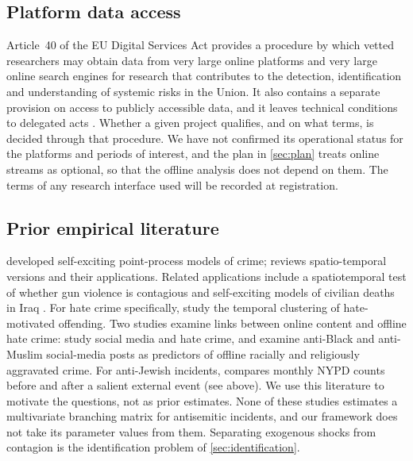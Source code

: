 \FloatBarrier
\subsection{Platform data access}\label{app:data-platform}

Article~40 of the EU Digital Services Act provides a procedure by which
vetted researchers may obtain data from very large online platforms and
very large online search engines for research that contributes to the detection,
identification and understanding of systemic risks in the Union. It also
contains a separate provision on access to publicly accessible data, and it
leaves technical conditions to delegated acts \citep{eu2022dsa}. Whether a
given project qualifies, and on what terms, is decided through that
procedure. We have not confirmed its operational status for the platforms
and periods of interest, and the plan in \cref{sec:plan} treats online
streams as optional, so that the offline analysis does not depend on them.
The terms of any research interface used will be recorded at registration.

\subsection{Prior empirical literature}\label{sec:data-lit}

 developed self-exciting point-process models of
crime; \citet{reinhart2018} reviews spatio-temporal versions and their
applications. Related applications include a spatiotemporal test of whether
gun violence is contagious \citep{loeffler2018} and self-exciting models of
civilian deaths in Iraq \citep{lewis2012}. For hate crime specifically,
\citet{king2013} study the temporal clustering of hate-motivated offending.
Two studies examine links between online content and offline hate crime:
\citet{muller2021} study social media and hate crime, and
\citet{williams2020} examine anti-Black and anti-Muslim social-media posts
as predictors of offline racially and religiously aggravated crime. For
anti-Jewish incidents, \citet{rosenbaum2025} compares monthly NYPD counts
before and after a salient external event (see above). We use this
literature to motivate the questions, not as prior estimates. None of these
studies estimates a multivariate branching matrix for antisemitic incidents,
and our framework does not take its parameter values from them. Separating
exogenous shocks from contagion is the identification problem of
\cref{sec:identification}.

